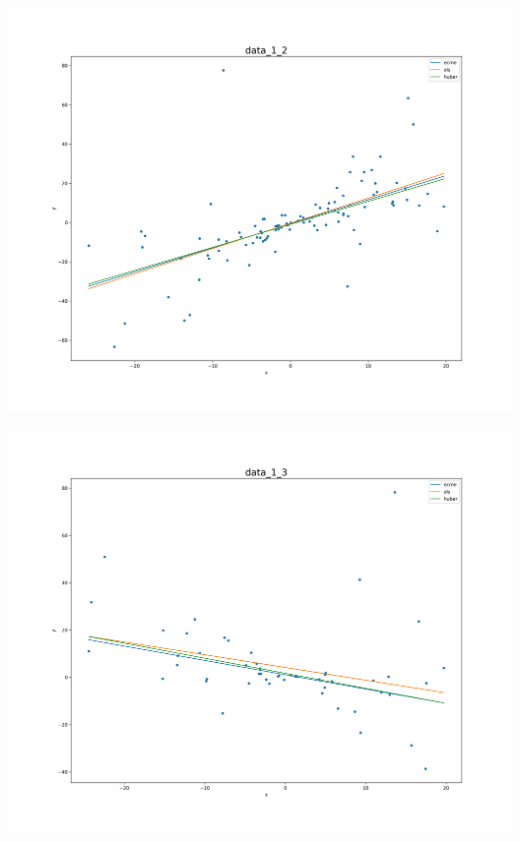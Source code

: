 \documentclass[11pt, a4 paper]{article}
\begin{document}
\begin{minipage}{.5\textwidth}
\includegraphics[scale=0.25]{data_1_2-figure.png}
\end{minipage}%
\begin{minipage}{.5\textwidth}
\includegraphics[scale=0.25]{data_1_3-figure.png}
\end{minipage}
\end{document}
